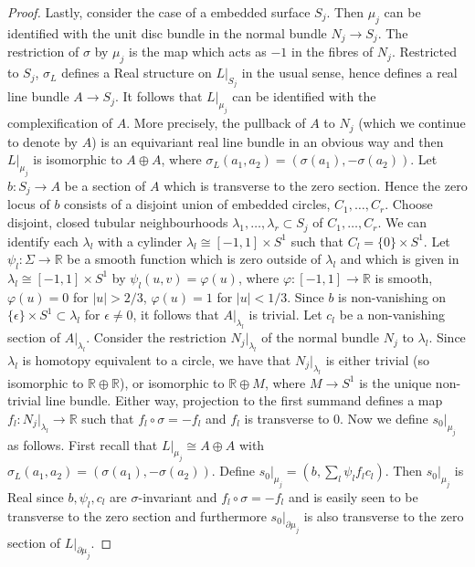 \documentclass{amsart}
\theoremstyle{definition}
\theoremstyle{remark}
\numberwithin{equation}{section}
\begin{document}
\begin{proof}
Lastly, consider the case of a embedded surface $S_j$. Then $\mu_j$ can be identified with the unit disc bundle in the normal bundle $N_j \to S_j$. The restriction of $\sigma$ by $\mu_j$ is the map which acts as $-1$ in the fibres of $N_j$. Restricted to $S_j$, $\sigma_L$ defines a Real structure on $L|_{S_j}$ in the usual sense, hence defines a real line bundle $A \to S_j$. It follows that $L|_{\mu_j}$ can be identified with the complexification of $A$. More precisely, the pullback of $A$ to $N_j$ (which we continue to denote by $A$) is an equivariant real line bundle in an obvious way and then $L|_{\mu_j}$ is isomorphic to $A \oplus A$, where $\sigma_L( a_1 , a_2 ) = ( \sigma(a_1) , -\sigma(a_2) )$. Let $b : S_j \to A$ be a section of $A$ which is transverse to the zero section. Hence the zero locus of $b$ consists of a disjoint union of embedded circles, $C_1, \dots , C_r$. Choose disjoint, closed tubular neighbourhoods $\lambda_1, \dots , \lambda_r \subset S_j$ of $C_1,\dots , C_r$. We can identify each $\lambda_l$ with a cylinder $\lambda_l \cong [-1,1] \times S^1$ such that $C_l = \{0 \} \times S^1$. Let $\psi_l : \Sigma \to \mathbb{R}$ be a smooth function which is zero outside of $\lambda_l$ and which is given in $\lambda_l \cong [-1,1] \times S^1$ by $\psi_l( u,v ) = \varphi(u)$, where $\varphi : [-1,1] \to \mathbb{R}$ is smooth, $\varphi(u) = 0$ for $|u| > 2/3$, $\varphi(u) = 1$ for $|u| < 1/3$. Since $b$ is non-vanishing on $\{ \epsilon \} \times S^1 \subset \lambda_l$ for $\epsilon \neq 0$, it follows that $A|_{\lambda_l}$ is trivial. Let $c_l$ be a non-vanishing section of $A|_{\lambda_l}$. Consider the restriction $N_j |_{\lambda_l}$ of the normal bundle $N_j$ to $\lambda_l$. Since $\lambda_l$ is homotopy equivalent to a circle, we have that $N_j|_{\lambda_l}$ is either trivial (so isomorphic to $\mathbb{R} \oplus \mathbb{R}$), or isomorphic to $\mathbb{R} \oplus M$, where $M \to S^1$ is the unique non-trivial line bundle. Either way, projection to the first summand defines a map $f_l : N_j|_{\lambda_l} \to \mathbb{R}$ such that $f_l \circ \sigma = -f_l$ and $f_l$ is transverse to $0$. Now we define $s_0|_{\mu_j}$ as follows. First recall that $L|_{\mu_j} \cong A \oplus A$ with $\sigma_L(a_1,a_2) = (\sigma(a_1) , -\sigma(a_2))$. Define $s_0|_{\mu_j} = ( b , \sum_l \psi_l f_l c_l)$. Then $s_0|_{\mu_j}$ is Real since $b, \psi_l, c_l$ are $\sigma$-invariant and $f_l \circ \sigma = -f_l$ and is easily seen to be transverse to the zero section and furthermore $s_0|_{\partial \mu_j}$ is also transverse to the zero section of $L|_{\partial \mu_j}$.
\end{proof}
\end{document}
